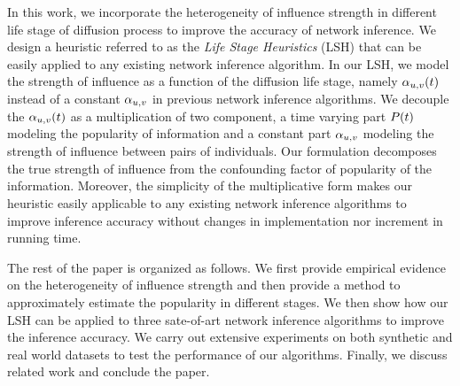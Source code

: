 In this work, we incorporate the heterogeneity of influence strength in different life stage of diffusion process to improve the accuracy of network inference. We design a heuristic referred to as the \emph{Life Stage Heuristics} (LSH) that can be easily applied to any existing network inference algorithm. In our LSH, we model the strength of influence as a function of the diffusion life stage, namely $\alpha_{u,v}(t)$ instead of a constant $\alpha_{u,v}$ in previous network inference algorithms. We decouple the $\alpha_{u,v}(t)$ as a multiplication of two component, a time varying part $P(t)$ modeling the popularity of information and a constant part $\alpha_{u,v}$ modeling the strength of influence between pairs of individuals. Our formulation decomposes the true strength of influence from the confounding factor of popularity of the information. Moreover, the simplicity of the multiplicative form makes our heuristic easily applicable to any existing network inference algorithms to improve inference accuracy without changes in implementation nor increment in running time.   


The rest of the paper is organized as follows. We first provide empirical evidence on the heterogeneity of influence strength and then provide a method to approximately estimate the popularity in different stages. We then show how our LSH can be applied to three sate-of-art network inference algorithms to improve the inference accuracy. We carry out extensive experiments on both synthetic and real world datasets to test the performance of our algorithms. Finally, we discuss related work and conclude the paper.  
